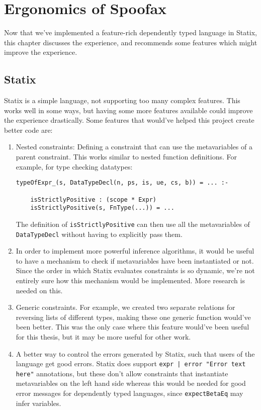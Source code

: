 \chapter{Ergonomics of Spoofax}

Now that we've implemented a feature-rich dependently typed language in Statix, this chapter discusses the experience, and recommends some features which might improve the experience. 

\section{Statix}

Statix is a simple language, not supporting too many complex features. This works well in some ways, but having some more features available could improve the experience drastically. Some features that would've helped this project create better code are:

\begin{enumerate}
	\item Nested constraints: Defining a constraint that can use the metavariables of a parent constraint. This works similar to nested function definitions. For example, for type checking datatypes:
	\begin{lstlisting}
typeOfExpr_(s, DataTypeDecl(n, ps, is, ue, cs, b)) = ... :-

	isStrictlyPositive : (scope * Expr)
	isStrictlyPositive(s, FnType(...)) = ...
	\end{lstlisting}
	The definition of \verb|isStrictlyPositive| can then use all the metavariables of \verb|DataTypeDecl| without having to explicitly pass them.
	
	\item In order to implement more powerful inference algorithms, it would be useful to have a mechanism to check if metavariables have been instantiated or not. Since the order in which Statix evaluates constraints is so dynamic, we're not entirely sure how this mechanism would be implemented. More research is needed on this.
	
	\item Generic constraints. For example, we created two separate relations for reversing lists of different types, making these one generic function would've been better. This was the only case where this feature would've been useful for this thesis, but it may be more useful for other work.
	
	\item A better way to control the errors generated by Statix, such that users of the language get good errors. Statix does support \texttt{expr | error "Error text here"} annotations, but these don't allow constraints that instantiate metavariables on the left hand side whereas this would be needed for good error messages for dependently typed languages, since \verb|expectBetaEq| may infer variables. 
\end{enumerate}

